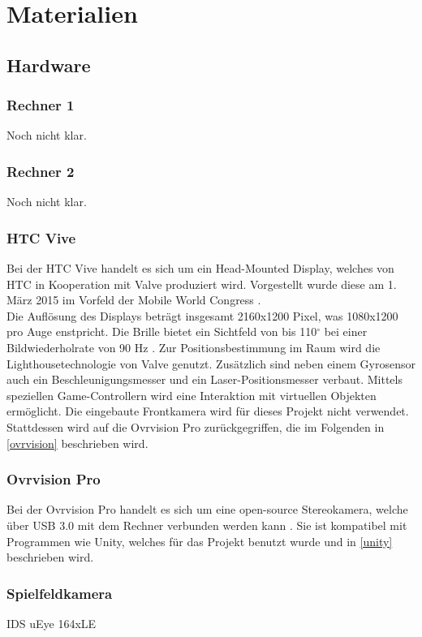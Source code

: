 \section{Materialien}
\subsection{Hardware}
\subsubsection{Rechner 1} 
Noch nicht klar.
\subsubsection{Rechner 2} 
Noch nicht klar.
\subsubsection{HTC Vive} 
Bei der HTC Vive handelt es sich um ein Head-Mounted Display, welches von HTC in Kooperation mit Valve \cite{website:Valve} produziert wird. Vorgestellt wurde diese am 1. März 2015 im Vorfeld der Mobile World Congress \cite{website:mobileworldcongress}.\\
Die Auflösung des Displays beträgt insgesamt 2160x1200 Pixel, was 1080x1200 pro Auge enstpricht. Die Brille bietet ein Sichtfeld von bis 110$^\circ$ bei einer Bildwiederholrate von 90 Hz \cite{website:HTC_Vive}. Zur Positionsbestimmung im Raum wird die  Lighthousetechnologie von Valve genutzt. Zusätzlich sind neben einem Gyrosensor auch ein Beschleunigungsmesser und ein Laser-Positionsmesser verbaut. Mittels speziellen Game-Controllern wird eine Interaktion mit virtuellen Objekten ermöglicht. Die eingebaute Frontkamera wird für dieses Projekt nicht verwendet. Stattdessen wird auf die Ovrvision Pro zurückgegriffen, die im Folgenden in \ref{ovrvision} beschrieben wird.

\subsubsection{Ovrvision Pro \label{ovrvision}} 
Bei der Ovrvision Pro handelt es sich um eine open-source Stereokamera, welche über USB 3.0 mit dem Rechner verbunden werden kann \cite{website:ovrvision}. Sie ist kompatibel mit Programmen wie Unity, welches für das Projekt benutzt wurde und in \ref{unity} beschrieben wird. 



\subsubsection{Spielfeldkamera} 
IDS uEye 164xLE

